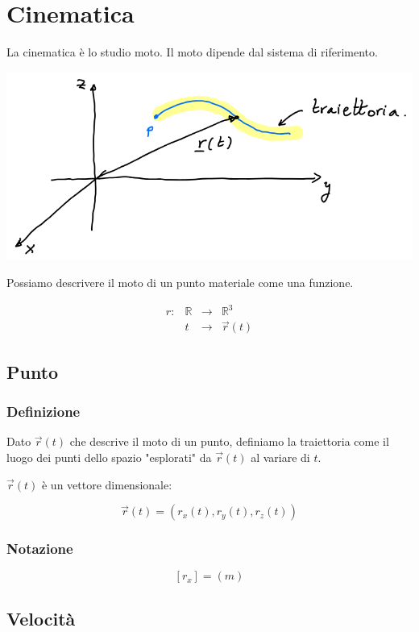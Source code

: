 \documentclass{subfiles}
\begin{document}
\section{Cinematica}

La cinematica è lo studio moto. Il moto dipende dal sistema di riferimento.

\includegraphics[width=\columnwidth]{moto-di-un-punto}

\noindent
Possiamo descrivere il moto di un punto materiale come una funzione.

$$
\begin{matrix}
r: &\mathbb{R} &\to &\mathbb{R}^3 \\
&t &\to &\vec{r}(t)
\end{matrix}
$$

\subsection{Punto}

\subsubsection{Definizione}

Dato $\vec{r}(t)$ che descrive il moto di un punto, definiamo la traiettoria come il luogo dei punti dello spazio "esplorati" da $\vec{r}(t)$ al variare di $t$.

\noindent
$\vec{r}(t)$ è un vettore dimensionale:

$$
\vec{r}(t) = (r_x(t), r_y(t), r_z(t))
$$

\subsubsection{Notazione}

$$
[r_x] = (m)
$$

\subsection{Velocità}
\end{document}

